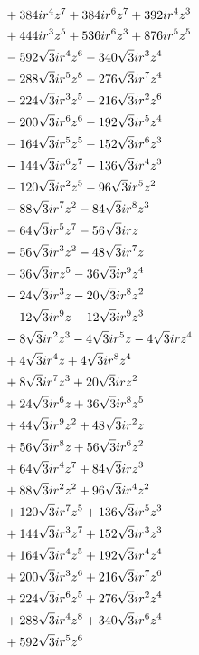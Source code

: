 \documentclass[11pt,a4paper]{article}
\begin{document}
\begin{align}
& + 384 i r^{4} z^{7} + 384 i r^{6} z^{7} + 392 i r^{4} z^{3}\notag\\
& + 444 i r^{3} z^{5} + 536 i r^{6} z^{3} + 876 i r^{5} z^{5}\notag\\
& - 592 \sqrt{3} i r^{4} z^{6} - 340 \sqrt{3} i r^{3} z^{4}\notag\\
& - 288 \sqrt{3} i r^{5} z^{8} - 276 \sqrt{3} i r^{7} z^{4}\notag\\
& - 224 \sqrt{3} i r^{3} z^{5} - 216 \sqrt{3} i r^{2} z^{6}\notag\\
& - 200 \sqrt{3} i r^{6} z^{6} - 192 \sqrt{3} i r^{5} z^{4}\notag\\
& - 164 \sqrt{3} i r^{5} z^{5} - 152 \sqrt{3} i r^{6} z^{3}\notag\\
& - 144 \sqrt{3} i r^{6} z^{7} - 136 \sqrt{3} i r^{4} z^{3}\notag\\
& - 120 \sqrt{3} i r^{2} z^{5} - 96 \sqrt{3} i r^{5} z^{2}\notag\\
& - 88 \sqrt{3} i r^{7} z^{2} - 84 \sqrt{3} i r^{8} z^{3}\notag\\
& - 64 \sqrt{3} i r^{5} z^{7} - 56 \sqrt{3} i r z\notag\\
& - 56 \sqrt{3} i r^{3} z^{2} - 48 \sqrt{3} i r^{7} z\notag\\
& - 36 \sqrt{3} i r z^{5} - 36 \sqrt{3} i r^{9} z^{4}\notag\\
& - 24 \sqrt{3} i r^{3} z - 20 \sqrt{3} i r^{8} z^{2}\notag\\
& - 12 \sqrt{3} i r^{9} z - 12 \sqrt{3} i r^{9} z^{3}\notag\\
& - 8 \sqrt{3} i r^{2} z^{3} - 4 \sqrt{3} i r^{5} z - 4 \sqrt{3} i r z^{4}\notag\\
& + 4 \sqrt{3} i r^{4} z + 4 \sqrt{3} i r^{8} z^{4}\notag\\
& + 8 \sqrt{3} i r^{7} z^{3} + 20 \sqrt{3} i r z^{2}\notag\\
& + 24 \sqrt{3} i r^{6} z + 36 \sqrt{3} i r^{8} z^{5}\notag\\
& + 44 \sqrt{3} i r^{9} z^{2} + 48 \sqrt{3} i r^{2} z\notag\\
& + 56 \sqrt{3} i r^{8} z + 56 \sqrt{3} i r^{6} z^{2}\notag\\
& + 64 \sqrt{3} i r^{4} z^{7} + 84 \sqrt{3} i r z^{3}\notag\\
& + 88 \sqrt{3} i r^{2} z^{2} + 96 \sqrt{3} i r^{4} z^{2}\notag\\
& + 120 \sqrt{3} i r^{7} z^{5} + 136 \sqrt{3} i r^{5} z^{3}\notag\\
& + 144 \sqrt{3} i r^{3} z^{7} + 152 \sqrt{3} i r^{3} z^{3}\notag\\
& + 164 \sqrt{3} i r^{4} z^{5} + 192 \sqrt{3} i r^{4} z^{4}\notag\\
& + 200 \sqrt{3} i r^{3} z^{6} + 216 \sqrt{3} i r^{7} z^{6}\notag\\
& + 224 \sqrt{3} i r^{6} z^{5} + 276 \sqrt{3} i r^{2} z^{4}\notag\\
& + 288 \sqrt{3} i r^{4} z^{8} + 340 \sqrt{3} i r^{6} z^{4}\notag\\
& + 592 \sqrt{3} i r^{5} z^{6}
\label{eq:cat-numerator-73}
\end{align}
\end{document}
